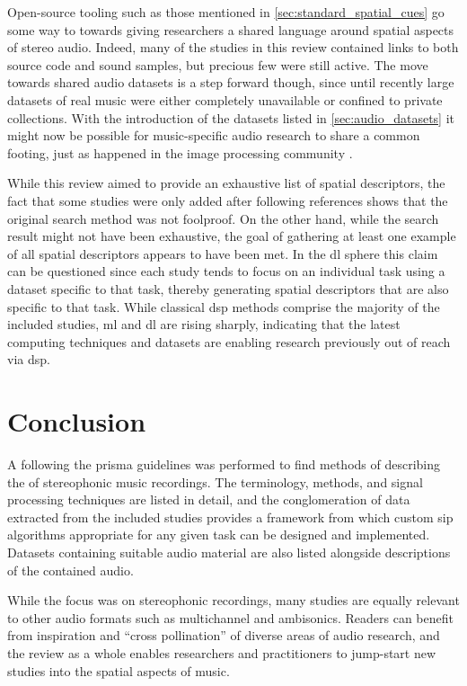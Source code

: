 \documentclass[referee,pdflatex,sn-mathphys-num]{sn-jnl}%
\newcommand{\q}[1]{\enquote{#1}}
\begin{document}
Open-source tooling such as those mentioned in \cref{sec:standard_spatial_cues} go some way to towards giving researchers a shared language around spatial aspects of stereo audio. Indeed, many of the studies in this review contained links to both source code and sound samples, but precious few were still active. The move towards shared audio datasets is a step forward though, since until recently large datasets of real music were either completely unavailable or confined to private collections. With the introduction of the datasets listed in \cref{sec:audio_datasets} it might now be possible for music-specific audio research to share a common footing, just as happened in the image processing community \cite{defferrardFMADatasetMusic2017}.

While this review aimed to provide an exhaustive list of spatial descriptors, the fact that some studies were only added after following references shows that the original search method was not foolproof. On the other hand, while the search result might not have been exhaustive, the goal of gathering at least one example of all spatial descriptors appears to have been met. In the \gls{dl} sphere this claim can be questioned since each study tends to focus on an individual task using a dataset specific to that task, thereby generating spatial descriptors that are also specific to that task. While classical \gls{dsp} methods comprise the majority of the included studies, \gls{ml} and \gls{dl} are rising sharply, indicating that the latest computing techniques and datasets are enabling research previously out of reach via \gls{dsp}.

\section{Conclusion}
\label{sec:conclusion}

A  following the \gls{prisma} guidelines was performed to find methods of describing the  of stereophonic music recordings. The terminology, methods, and signal processing techniques are listed in detail, and the conglomeration of data extracted from the included studies provides a framework from which custom \gls{sip} algorithms appropriate for any given task can be designed and implemented. Datasets containing suitable audio material are also listed alongside descriptions of the contained audio.

While the focus was on stereophonic recordings, many studies are equally relevant to other audio formats such as multichannel and ambisonics. Readers can benefit from inspiration and \q{cross pollination} of diverse areas of audio research, and the review as a whole enables researchers and practitioners to jump-start new studies into the spatial aspects of music.
\end{document}
